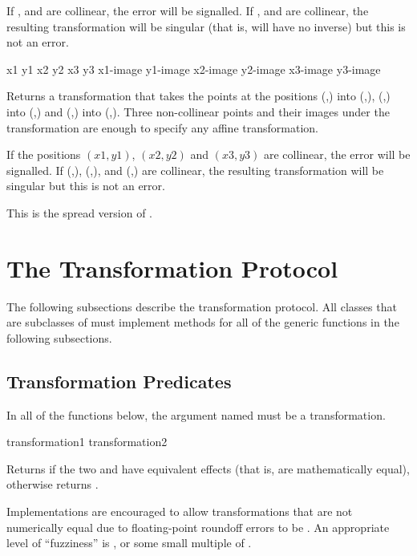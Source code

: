 If ,  and  are collinear, the
 error will be signalled.  If
,  and  are collinear,
the resulting transformation will be singular (that is, will have no inverse)
but this is not an error.


 {x1 y1 x2 y2 x3 y3 x1-image y1-image x2-image y2-image x3-image y3-image}

Returns a transformation that takes the points at the positions
(,) into (,), (,)
into (,) and (,) into
(,).  Three non-collinear points and their images
under the transformation are enough to specify any affine transformation.

If the positions $(x1,y1)$, $(x2,y2)$ and $(x3,y3)$ are collinear, the
 error will be signalled.  If
(,), (,), and
(,) are collinear, the resulting transformation will
be singular but this is not an error.

This is the spread version of .


\section {The Transformation Protocol}

The following subsections describe the transformation protocol.  All classes
that are subclasses of  must implement methods for all of
the generic functions in the following subsections.


\subsection {Transformation Predicates}

In all of the functions below, the argument named  must be a
transformation.

 {transformation1 transformation2} 

Returns  if the two   and
 have equivalent effects (that is, are mathematically
equal), otherwise returns .

Implementations are encouraged to allow transformations that are not numerically
equal due to floating-point roundoff errors to be .  An
appropriate level of ``fuzziness'' is , or some small
multiple of .


